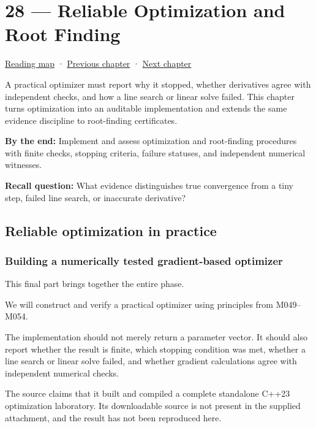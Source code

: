 \hypertarget{02-foundations-ii-ch028}{}
\chapter{28 --- Reliable Optimization and Root Finding}\label{02-foundations-ii-ch028-reliable-optimization-and-root-finding}

\hyperref[volume-reading-map]{Reading map} · \hyperref[02-foundations-ii-ch027-gaussnewton-for-geometry-and-pose]{Previous chapter} · \hyperref[02-foundations-ii-ch029-discretization-convergence-and-experimental-design]{Next chapter}

A practical optimizer must report why it stopped, whether derivatives agree with independent checks, and how a line search or linear solve failed. This chapter turns optimization into an auditable implementation and extends the same evidence discipline to root-finding certificates.

\textbf{By the end:} Implement and assess optimization and root-finding procedures with finite checks, stopping criteria, failure statuses, and independent numerical witnesses.

\textbf{Recall question:} What evidence distinguishes true convergence from a tiny step, failed line search, or inaccurate derivative?

\section{Reliable optimization in practice}\label{02-foundations-ii-ch028-reliable-optimization-in-practice}

\subsection{Building a numerically tested gradient-based optimizer}\label{02-foundations-ii-ch028-building-a-numerically-tested-gradient-based-optimizer}

This final part brings together the entire phase.

We will construct and verify a practical optimizer using principles from M049--M054.

The implementation should not merely return a parameter vector. It should also report whether the result is finite, which stopping condition was met, whether a line search or linear solve failed, and whether gradient calculations agree with independent numerical checks.

The source claims that it built and compiled a complete standalone C++23 optimization laboratory. Its downloadable source is not present in the supplied attachment, and the result has not been reproduced here.

